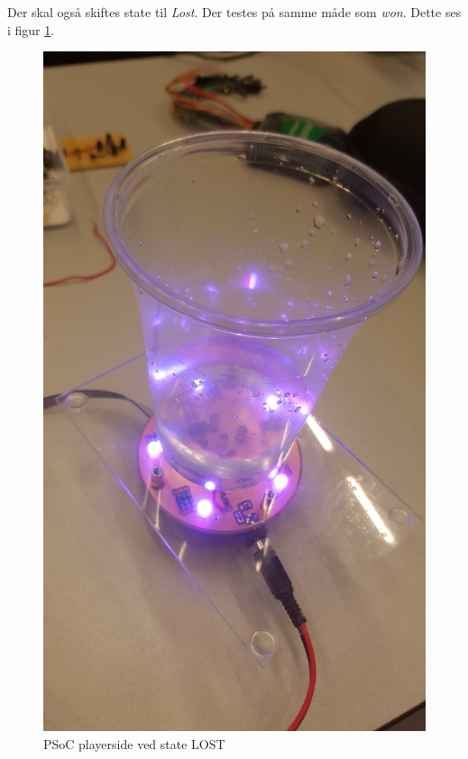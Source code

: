 \documentclass[Integrationstest/Integrationstest_main.tex]{subfiles}
\begin{document}
Der skal også skiftes state til \textit{Lost}. Der testes på samme måde som \textit{won}. Dette ses i figur \ref{fig:int_playerside_loss}.
\begin{figure}[H]
    \centering
    \includegraphics[width=\textwidth]{Integrationstest/Integrationstest_PlayerSide/graphics/CupSensorInt/LOST.jpg}
    \caption{PSoC playerside ved state LOST}
    \label{fig:int_playerside_loss}
\end{figure}
\end{document}
